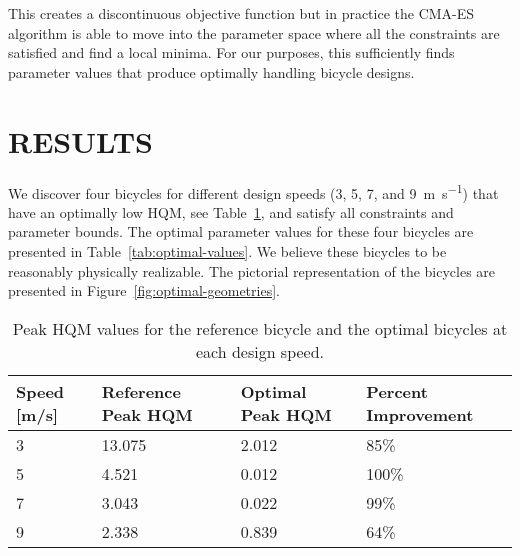 \documentclass{bmd2019p}
\begin{document}
This creates a discontinuous objective function but in practice the CMA-ES
algorithm is able to move into the parameter space where all the constraints
are satisfied and find a local minima. For our purposes, this sufficiently
finds parameter values that produce optimally handling bicycle designs.

\section{RESULTS}
%
We discover four bicycles for different design speeds (3, 5, 7, and
9~\si{\meter\per\second}) that have an optimally low HQM, see
Table~\ref{tab:hqm}, and satisfy all constraints and parameter bounds. The
optimal parameter values for these four bicycles are presented in
Table~\ref{tab:optimal-values}. We believe these bicycles to be reasonably
physically realizable. The pictorial representation of the bicycles are
presented in Figure~\ref{fig:optimal-geometries}.
%
\begin{table}
  \caption{Peak HQM values for the reference bicycle and the optimal bicycles
    at each design speed.}
  \label{tab:hqm}
  \centering
  \begin{tabular}{llll}
    \toprule
    Speed [m/s] & Reference Peak HQM & Optimal Peak HQM & Percent Improvement \\
    \midrule
    3 & 13.075 & 2.012 & 85\% \\
    5 & 4.521  & 0.012 & 100\% \\
    7 & 3.043  & 0.022 & 99\% \\
    9 & 2.338  & 0.839 & 64\% \\
    \bottomrule
  \end{tabular}
\end{table}
%
\end{document}
